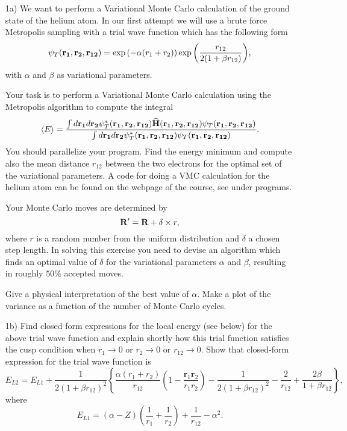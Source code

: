 \documentclass[10pt]{article}
\newcommand{\OP}[1]{{\bf\widehat{#1}}}
\begin{document}
\begin{enumerate}

\item[1a)] We want to perform  a Variational Monte Carlo calculation of the ground state of the helium atom.
In our first attempt we will use a brute force Metropolis sampling with a trial wave function which has the following form
\begin{equation}
   \psi_{T}({\bf r_1},{\bf r_2}, {\bf r_{12}}) = 
   \exp{\left(-\alpha(r_1+r_2)\right)}
   \exp{\left(\frac{r_{12}}{2(1+\beta r_{12})}\right)}, 
\label{eq:trial}
\end{equation}
with $\alpha$ and $\beta$ as variational parameters.

Your task is to perform a Variational Monte Carlo calculation
using the Metropolis algorithm to compute the integral
\begin{equation}
   \langle E \rangle =
   \frac{\int d{\bf r_1}d{\bf r_2}\psi^{\ast}_T({\bf r_1},{\bf r_2}, {\bf r_{12}})\OP{H}({\bf r_1},{\bf r_2}, {\bf r_{12}})\psi_T({\bf r_1},{\bf r_2}, {\bf r_{12}})}
        {\int d{\bf r_1}d{\bf r_2}\psi^{\ast}_T({\bf r_1},{\bf r_2}, {\bf r_{12}})\psi_T({\bf r_1},{\bf r_2}, {\bf r_{12}})}.
\end{equation}
You should parallelize your program.   Find the  energy minimum and compute also the mean distance
$r_{12}$ between the two electrons for the optimal set of the variational parameters.
A code for doing a VMC calculation for the helium atom can be 
found on the webpage of the course, see under programs.

Your Monte Carlo moves are determined by
\begin{equation}
   {\bf R}' = {\bf R} +\delta \times r,
\end{equation}
where $r$ is a random number from the uniform distribution and $\delta$
a chosen step length.
In solving this exercise you need to devise an algorithm which finds
an optimal value of $\delta$ for the variational parameters $\alpha$ and $\beta$,
resulting in roughly $50\%$ accepted moves. 

Give a physical  interpretation of the best value of $\alpha$.
Make a plot of the variance as a function of the number of Monte Carlo
cycles.
\item[1b)]
Find closed form expressions for the local energy (see below) for the above 
trial wave function and explain shortly how this 
trial function satisfies 
the cusp condition when $r_1\rightarrow 0$ or
$r_2\rightarrow 0$ or  $r_{12}\rightarrow 0$. Show that
closed-form expression for the trial wave function is
\[ 
E_{L2} = E_{L1}+\frac{1}{2(1+\beta r_{12})^2}\left\{\frac{\alpha(r_1+r_2)}{r_{12}}(1-\frac{\mathbf{r}_1\mathbf{r}_2}{r_1r_2})-\frac{1}{2(1+\beta r_{12})^2}-\frac{2}{r_{12}}+\frac{2\beta}{1+\beta r_{12}}\right\},
\]
where
\[ 
E_{L1} = \left(\alpha-Z\right)\left(\frac{1}{r_1}+\frac{1}{r_2}\right)+\frac{1}{r_{12}}-\alpha^2.
\]


\end{enumerate}
\end{document}
